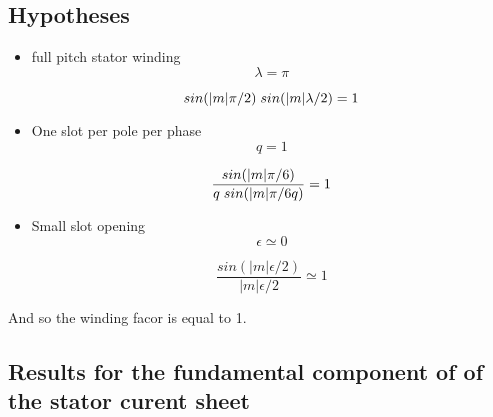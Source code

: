 \subsection{Hypotheses}
\begin{itemize}
    \item full pitch stator winding
    \begin{equation*}
\lambda = \pi
\end{equation*}

\begin{equation*}
sin(|m| \pi/2) \hspace{1mm} sin(|m| \lambda/2) = 1 
\end{equation*}

\item One slot per pole per phase
\begin{equation*}
q = 1
\end{equation*}

\begin{equation*}
\frac{sin(|m| \pi/6)}{q\hspace{1mm} sin(|m| \pi/6q)}   = 1 
\end{equation*}

\item Small slot opening
\begin{equation*}
\epsilon \simeq 0
\end{equation*}

\begin{equation*}
\frac{sin(|m| \epsilon/2)}{|m| \epsilon/2}   \simeq 1 
\end{equation*}

\end{itemize}

And so the winding facor is equal to 1.

\subsection{Results for the fundamental component of of the stator curent sheet}

